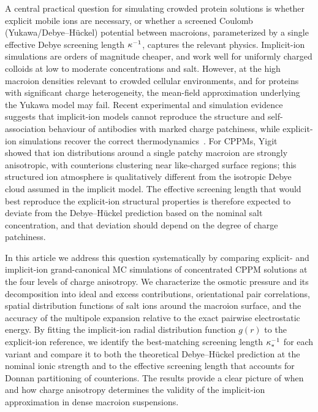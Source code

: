\documentclass{article}
\begin{document}
A central practical question for simulating crowded protein solutions is whether explicit mobile ions are necessary, or whether a screened Coulomb (Yukawa/Debye--Hückel) potential between macroions, parameterized by a single effective Debye screening length $\kappa^{-1}$, captures the relevant physics.
Implicit-ion simulations are orders of magnitude cheaper, and work well for uniformly charged colloids at low to moderate concentrations and salt.
However, at the high macroion densities relevant to crowded cellular environments, and for proteins with significant charge heterogeneity, the mean-field approximation underlying the Yukawa model may fail.
Recent experimental and simulation evidence suggests that implicit-ion models cannot reproduce the structure and self-association behaviour of antibodies with marked charge patchiness, while explicit-ion simulations recover the correct thermodynamics~\cite{ausserwoger2023}.
For CPPMs, Yigit \etal~\cite{yigit2015a} showed that ion distributions around a single patchy macroion are strongly anisotropic, with counterions clustering near like-charged surface regions; this structured ion atmosphere is qualitatively different from the isotropic Debye cloud assumed in the implicit model.
The effective screening length that would best reproduce the explicit-ion structural properties is therefore expected to deviate from the Debye--Hückel prediction based on the nominal salt concentration, and that deviation should depend on the degree of charge patchiness.

In this article we address this question systematically by comparing explicit- and implicit-ion grand-canonical MC simulations of concentrated CPPM solutions at the four levels of charge anisotropy.
We characterize the osmotic pressure and its decomposition into ideal and excess contributions, orientational pair correlations, spatial distribution functions of salt ions around the macroion surface, and the accuracy of the multipole expansion relative to the exact pairwise electrostatic energy.
By fitting the implicit-ion radial distribution function $g(r)$ to the explicit-ion reference, we identify the best-matching screening length $\kappa^{-1}_*$ for each variant and compare it to both the theoretical Debye--Hückel prediction at the nominal ionic strength and to the effective screening length that accounts for Donnan partitioning of counterions.
The results provide a clear picture of when and how charge anisotropy determines the validity of the implicit-ion approximation in dense macroion suspensions.
\end{document}
